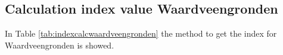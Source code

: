 \documentclass[a4paper,12pt]{scrbook}
\begin{document}
{%
%
%
%
%

\clearpage

\begin{appendices}

\appendixpage

\chapter{Calculation index value Waardveengronden}
\label{app:calcwaardveengrond}

In Table \ref{tab:indexcalcwaardveengronden} the method to get the index for Waardveengronden is showed. 


\end{appendices}}
\end{document}
